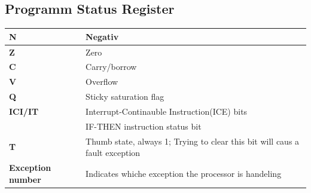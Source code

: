 \subsection{Programm Status Register}
\renewcommand{\arraystretch}{1.2}
\begin{minipage}{\linewidth}
    \begin{tabular}{|l|l|}
        \hline 
        \textbf{N}& Negativ \\ 
        \hline 
        \textbf{Z}& Zero  \\ 
        \hline 
        \textbf{C}& Carry/borrow  \\ 
        \hline 
        \textbf{V}& Overflow \\ 
        \hline 
        \textbf{Q}& Sticky saturation flag \\ 
        \hline 
        \textbf{ICI/IT}& Interrupt-Continauble Instruction(ICE) bits\\
                        & IF-THEN instruction status bit \\ 
        \hline 
        \textbf{T}& Thumb state, always 1; Trying to clear this bit will caus a fault exception \\ 
        \hline 
        \textbf{Exception number}& Indicates whiche exception the processor is handeling \\ 
        \hline 
    \end{tabular} 
\end{minipage}

